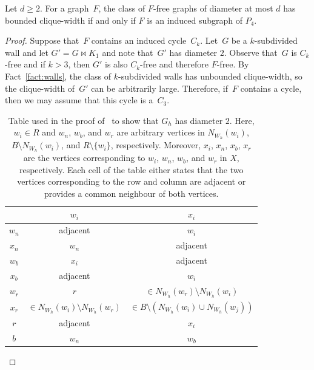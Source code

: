 \documentclass[runningheads,envcountsame]{llncs}
\newcommand{\forbiddenGraph}{F}
\newcommand{\join}{\bowtie}
\begin{document}
\begin{theorem}\label{thm:IS-CW}
Let $d\geq 2$. For a graph~$\forbiddenGraph$, the class of
  $\forbiddenGraph$-free graphs of diameter at most $d$
  has bounded clique-width if and only if $\forbiddenGraph$ is an
  induced subgraph of $P_4$.
\end{theorem}
\begin{proof}
  Suppose that~$\forbiddenGraph$ contains an induced cycle~$C_k$.
  Let~$G$ be a $k$-subdivided wall and let $G'=G \join K_1$ and note that~$G'$ has diameter $2$.
  Observe that~$G$ is $C_k$-free and if $k>3$, then $G'$ is also $C_k$-free and therefore $F$-free.
  By Fact~\ref{fact:walls}, the class of $k$-subdivided walls has unbounded clique-width, so the clique-width of~$G'$ can be arbitrarily large.
  Therefore, if~$F$ contains a cycle, then we may assume that this cycle is a~$C_3$.  

    \begin{table}[]
    \centering
    \begin{tabular}{c|c|c}
      & $w_i$ & $x_i$\\
      \hline
      $w_n$ & adjacent & $w_i$\\
      $x_n$ & $w_n$ & adjacent\\
      $w_b$ & $x_i$ & adjacent\\
      $x_b$ & adjacent & $w_i$\\
      $w_r$ & $r$ & $\in N_{W_h}(w_r) \setminus N_{W_h}(w_i)$\\
      $x_r$ & $\in N_{W_h}(w_i) \setminus N_{W_h}(w_r)$ & $\in B \setminus (N_{W_h}(w_i) \cup N_{W_h}(w_j))$ \\
      $r$ & adjacent & $x_i$\\
      $b$ & $w_{n}$ & $w_b$\\
    \end{tabular}
    \caption{Table used in the proof of~ to show that $G_h$
      has diameter $2$. Here, $w_i \in R$ and $w_n$, $w_b$, and $w_r$
      are arbitrary vertices in $N_{W_h}(w_i)$, $B
      \setminus N_{W_h}(w_i)$, and $R \setminus \{w_i\}$,
      respectively. Moreover, $x_i$, $x_n$, $x_b$, $x_r$ are the
      vertices corresponding to $w_i$, $w_n$, $w_b$, and $w_r$ in $X$,
      respectively. Each cell of the table either states that the two
      vertices corresponding to the row and column are adjacent or
      provides a common neighbour of both vertices.}
    \label{tab:commonNei}
  \end{table}


\end{proof}
\end{document}
